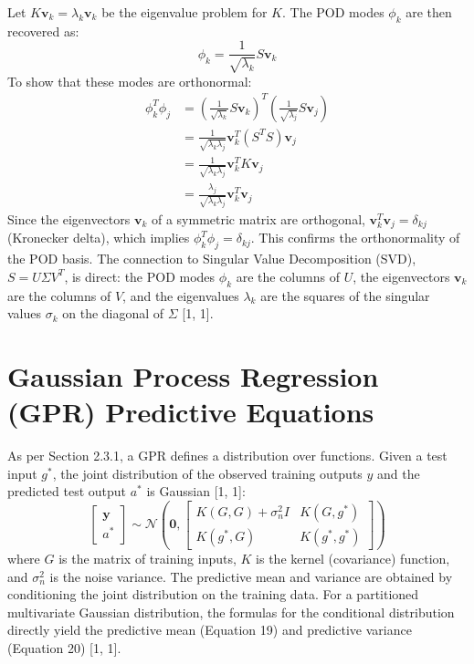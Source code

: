 \documentclass[dsc, EN]{ufabcFHZh}
\begin{document}
Let $K\mathbf{v}_k = \lambda_k \mathbf{v}_k$ be the eigenvalue problem for $K$. The POD modes $\phi_k$ are then recovered as:
\begin{equation}
    \phi_k = \frac{1}{\sqrt{\lambda_k}} S \mathbf{v}_k
\end{equation}
To show that these modes are orthonormal:
\begin{align*}
    \phi_k^T \phi_j &= \left( \frac{1}{\sqrt{\lambda_k}} S \mathbf{v}_k \right)^T \left( \frac{1}{\sqrt{\lambda_j}} S \mathbf{v}_j \right) \\
    &= \frac{1}{\sqrt{\lambda_k \lambda_j}} \mathbf{v}_k^T (S^T S) \mathbf{v}_j \\
    &= \frac{1}{\sqrt{\lambda_k \lambda_j}} \mathbf{v}_k^T K \mathbf{v}_j \\
    &= \frac{\lambda_j}{\sqrt{\lambda_k \lambda_j}} \mathbf{v}_k^T \mathbf{v}_j
\end{align*}
Since the eigenvectors $\mathbf{v}_k$ of a symmetric matrix are orthogonal, $\mathbf{v}_k^T \mathbf{v}_j = \delta_{kj}$ (Kronecker delta), which implies $\phi_k^T \phi_j = \delta_{kj}$. This confirms the orthonormality of the POD basis. The connection to Singular Value Decomposition (SVD), $S = U\Sigma V^T$, is direct: the POD modes $\phi_k$ are the columns of $U$, the eigenvectors $\mathbf{v}_k$ are the columns of $V$, and the eigenvalues $\lambda_k$ are the squares of the singular values $\sigma_k$ on the diagonal of $\Sigma$ {[1, 1]}.

\section{Gaussian Process Regression (GPR) Predictive Equations}
\label{sec:gpr_derivation}

As per Section 2.3.1, a GPR defines a distribution over functions. Given a test input $g^*$, the joint distribution of the observed training outputs $y$ and the predicted test output $a^*$ is Gaussian {[1, 1]}:
\begin{equation}
    \begin{bmatrix} \mathbf{y} \\ a^* \end{bmatrix} \sim \mathcal{N} \left( \mathbf{0}, \begin{bmatrix} K(G, G) + \sigma_n^2 I & K(G, g^*) \\ K(g^*, G) & K(g^*, g^*) \end{bmatrix} \right)
\end{equation}
where $G$ is the matrix of training inputs, $K$ is the kernel (covariance) function, and $\sigma_n^2$ is the noise variance. The predictive mean and variance are obtained by conditioning the joint distribution on the training data. For a partitioned multivariate Gaussian distribution, the formulas for the conditional distribution directly yield the predictive mean (Equation 19) and predictive variance (Equation 20) {[1, 1]}.
\end{document}
